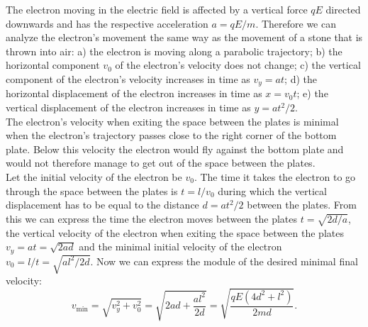 {\ifEngSolution
The electron moving in the electric field is affected by a vertical force $qE$ directed downwards and has the respective acceleration $a=qE/m$. Therefore we can analyze the electron’s movement the same way as the movement of a stone that is thrown into air: a) the electron is moving along a parabolic trajectory; b) the horizontal component $v_0$ of the electron’s velocity does not change; c) the vertical component of the electron’s velocity increases in time as $v_y=at$; d) the horizontal displacement of the electron increases in time as $x=v_0t$; e) the vertical displacement of the electron increases in time as $y=at^2/2$.\\
The electron’s velocity when exiting the space between the plates is minimal when the electron’s trajectory passes close to the right corner of the bottom plate. Below this velocity the electron would fly against the bottom plate and would not therefore manage to get out of the space between the plates.\\
Let the initial velocity of the electron be $v_0$. The time it takes the electron to go through the space between the plates is $t=l/v_0$ during which the vertical displacement has to be equal to the distance $d=at^2/2$ between the plates. From this we can express the time the electron moves between the plates $t=\sqrt{2d/a}$, the vertical velocity of the electron when exiting the space between the plates $v_y=at=\sqrt{2ad}$ and the minimal initial velocity of the electron $v_0=l/t=\sqrt{al^2/2d}$. Now we can express the module of the desired minimal final velocity:
\[
v_\mathrm{min}=\sqrt{v_y^2+v_0^2}=\sqrt{2ad+\frac{al^2}{2d}}=\sqrt{\frac{qE\left(4d^2+l^2\right)}{2md}}.
\]
\fi
}